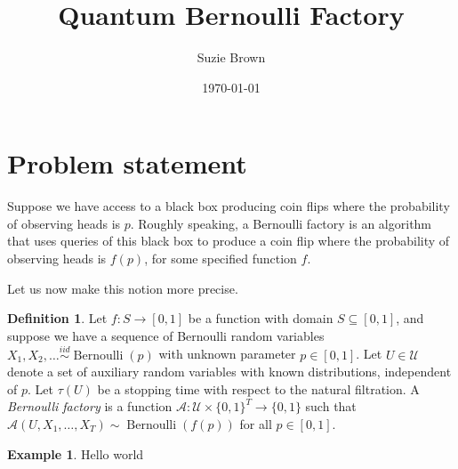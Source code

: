\documentclass{article}
\title{Quantum Bernoulli Factory}
\author{Suzie Brown}
\date{\today}
\newcommand{\Bern}{\operatorname{Bernoulli}}
\newcommand{\A}{\mathcal{A}}
\newcommand{\iidsim}{\overset{iid}{\sim}}
\theoremstyle{definition}
\newtheorem{defn}{Definition}
\newtheorem{example}{Example}
\begin{document}
\maketitle
\section*{Problem statement}
Suppose we have access to a black box producing coin flips where the probability of observing heads is $p$. Roughly speaking, a Bernoulli factory is an algorithm that uses queries of this black box to produce a coin flip where the probability of observing heads is $f(p)$, for some specified function $f$.

Let us now make this notion more precise.
\begin{defn}\label{defn:bern_fact}
Let $f: S\to[0,1]$ be a function with domain $S \subseteq [0,1]$, and suppose we have a sequence of Bernoulli random variables $X_1,X_2,\dots \iidsim \Bern(p)$ with unknown parameter $p \in [0,1]$. 
Let $U \in \mathcal{U}$ denote a set of auxiliary random variables with known distributions, independent of $p$. Let $\tau(U)$ be a stopping time with respect to the natural filtration.
A \emph{Bernoulli factory} is a function $\A : \mathcal{U} \times \{0,1\}^T \to\{0,1\}$ such that $\A(U,X_1,\dots,X_T) \sim \Bern(f(p))$ for all $p \in [0,1]$.
\end{defn}

\begin{example}
Hello world
\end{example}





\end{document}
